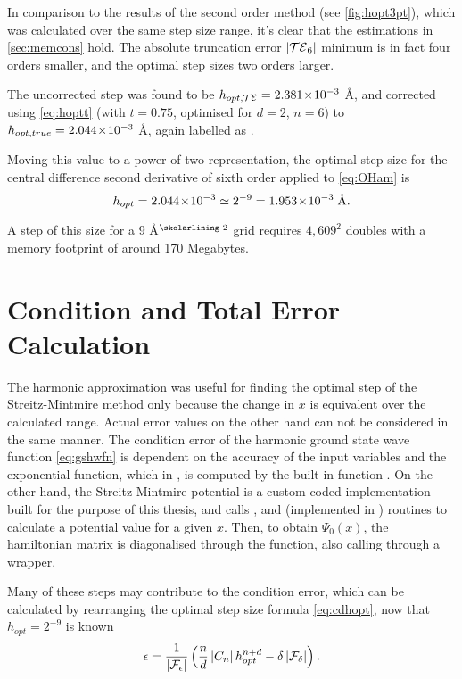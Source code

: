 In comparison to the results of the second order method (see \cref{fig:hopt3pt}), which was calculated over the same step size range, it's clear that the estimations in \cref{sec:memcons} hold.
The absolute truncation error $\left\lvert \mathcal{TE}_6\right\rvert$ minimum is in fact four orders smaller, and the optimal step sizes two orders larger.

The uncorrected step  was found to be $h_{opt,\mathcal{TE}} = 2.381\!\times\!10^{-3}$ Å, and corrected using \cref{eq:hoptt} (with $t=0.75$, optimised for $d=2$, $n=6$) to $h_{opt,true} = 2.044\!\times\!10^{-3}$ Å, again labelled as .

Moving this value to a power of two representation, the optimal step size for the central difference second derivative of sixth order applied to \cref{eq:OHam} is
\begin{equation}
h_{opt} = 2.044\!\times\!10^{-3} \simeq 2^{-9} = 1.953\!\times\!10^{-3}\;\text{Å}.
\end{equation}

A step of this size for a $9$ Å$^\text{\skolarlining 2}$ grid requires $4,609^2$ doubles with a memory footprint of around 170 Megabytes.

\section{Condition and Total Error Calculation}\label{sec:catoterr}

The harmonic approximation was useful for finding the optimal step of the Streitz-Mintmire method only because the change in $x$ is equivalent over the calculated range.
Actual error values on the other hand can not be considered in the same manner.
The condition error of the harmonic ground state wave function \cref{eq:gshwfn} is dependent on the accuracy of the input variables and the exponential function, which in , is computed by the built-in function .
On the other hand, the Streitz-Mintmire potential is a custom coded implementation built for the purpose of this thesis, and calls ,  and  (implemented in ) routines to calculate a potential value for a given $x$.
Then, to obtain $\Psi_0(x)$, the hamiltonian matrix is diagonalised through the  function, also calling  through a  wrapper.

Many of these steps may contribute to the condition error, which can be calculated by rearranging the optimal step size formula \cref{eq:cdhopt}, now that $h_{opt} = 2^{-9}$ is known
\begin{equation}
\epsilon = \frac{1}{\left\lvert \mathcal{F}_\epsilon\right\rvert}\left(\frac{n}{d}\left\lvert C_n\right\rvert h_{opt}^{n+d}-\delta\left\lvert \mathcal{F}_\delta\right\rvert\right).
\end{equation}

